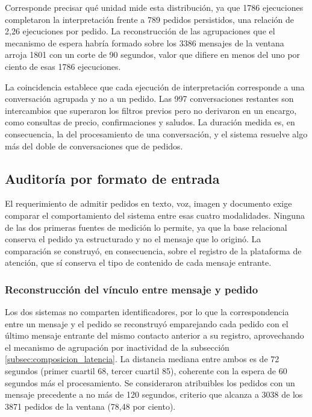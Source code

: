 Corresponde precisar qué unidad mide esta distribución, ya que 1786 ejecuciones completaron la interpretación frente a 789 pedidos persistidos, una relación de 2,26 ejecuciones por pedido. La reconstrucción de las agrupaciones que el mecanismo de espera habría formado sobre los 3386 mensajes de la ventana arroja 1801 con un corte de 90 segundos, valor que difiere en menos del uno por ciento de esas 1786 ejecuciones.

La coincidencia establece que cada ejecución de interpretación corresponde a una conversación agrupada y no a un pedido. Las 997 conversaciones restantes son intercambios que superaron los filtros previos pero no derivaron en un encargo, como consultas de precio, confirmaciones y saludos. La duración medida es, en consecuencia, la del procesamiento de una conversación, y el sistema resuelve algo más del doble de conversaciones que de pedidos.

\subsection{Auditoría por formato de entrada}
\label{subsec:ensayo_formatos}

El requerimiento de admitir pedidos en texto, voz, imagen y documento exige comparar el comportamiento del sistema entre esas cuatro modalidades. Ninguna de las dos primeras fuentes de medición lo permite, ya que la base relacional conserva el pedido ya estructurado y no el mensaje que lo originó. La comparación se construyó, en consecuencia, sobre el registro de la plataforma de atención, que sí conserva el tipo de contenido de cada mensaje entrante.

\subsubsection*{Reconstrucción del vínculo entre mensaje y pedido}

Los dos sistemas no comparten identificadores, por lo que la correspondencia entre un mensaje y el pedido se reconstruyó emparejando cada pedido con el último mensaje entrante del mismo contacto anterior a su registro, aprovechando el mecanismo de agrupación por inactividad de la subsección \ref{subsec:composicion_latencia}. La distancia mediana entre ambos es de 72 segundos (primer cuartil 68, tercer cuartil 85), coherente con la espera de 60 segundos más el procesamiento. Se consideraron atribuibles los pedidos con un mensaje precedente a no más de 120 segundos, criterio que alcanza a 3038 de los 3871 pedidos de la ventana (78,48 por ciento).

